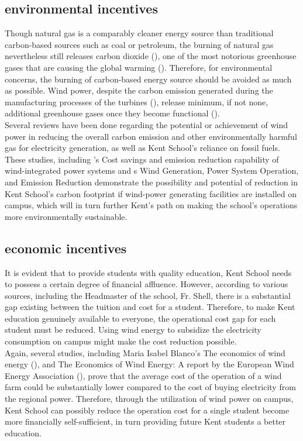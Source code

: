 \documentclass[review]{elsarticle}
\begin{document}
\subsection{environmental incentives}
\label{sec:intro:environincentives}
Though natural gas is a comparably cleaner energy source than traditional carbon-based sources such as coal or petroleum, the burning 
of natural gas nevertheless still releases carbon dioxide (\cite{cost_and_performance_baseline_for_fossil_energy_plants}), one of the most 
notorious greenhouse gases that are causing the global warming (\cite{Shakun2012_co2_global_warming}). Therefore, for environmental 
concerns, the burning of carbon-based energy source should be avoided as much as possible. Wind power, despite the carbon emission 
generated during the manufacturing processes of the turbines (\cite{Kaldellis_carbon_foortprint_of_offshore_wind_energy}), release 
minimum, if not none, additional greenhouse gases once they become functional (\cite{IEEE_wind_carbon_reduction}).
\\\indent Several reviews have been done regarding the potential or achievement of wind power in reducing the overall carbon emission 
and other environmentally harmful gas for electricity generation, as well as Kent School's reliance on fossil fuels. These studies, 
including \cite{rajat_cost_saving_and_emission_reduction}'s Cost savings and emission reduction capability of wind-integrated power 
systems and \cite{IEEE_wind_carbon_reduction} s Wind Generation, Power System Operation, and Emission Reduction demonstrate the 
possibility and potential of reduction in Kent School's carbon footprint if wind-power generating facilities are installed on 
campus, which will in turn further Kent's path on making the school's operations more environmentally sustainable.
 

\subsection{economic incentives}
\label{sec:intro:econincentives}
It is evident that to provide students with quality education, Kent School needs to possess a certain degree of financial affluence. 
However, according to various sources, including the Headmaster of the school, Fr. Shell, there is a substantial gap existing between 
the tuition and cost for a student. Therefore, to make Kent education genuinely available to everyone, the operational cost gap for 
each student must be reduced. Using wind energy to subsidize the electricity consumption on campus might make the cost reduction possible.
\\\indent Again, several studies, including Maria Isabel Blanco’s The economics of wind energy (\cite{maria_wind_energy_economics}), 
and The Economics of Wind Energy: A report by the European Wind Energy Association (\cite{european_wind_energy_association_report}), 
prove that the average cost of the operation of a wind farm could be substantially lower compared to the cost of buying electricity 
from the regional power. Therefore, through the utilization of wind power on campus, Kent School can possibly reduce the operation cost 
for a single student become more financially self-sufficient, in turn providing future Kent students a better education.   
\end{document}
